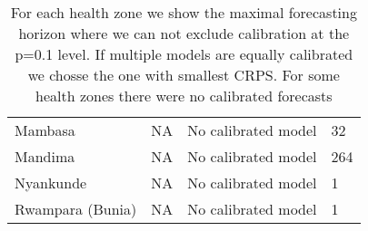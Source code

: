 \begin{table}[h!]
\begin{tabular}{|l|l|l|l|}
  Mambasa & NA & No calibrated model & 32 \\ 
  Mandima & NA & No calibrated model & 264 \\ 
  Nyankunde & NA & No calibrated model & 1 \\ 
  Rwampara (Bunia) & NA & No calibrated model & 1 \\ 
   \hline
\end{tabular}
\caption{For each health zone we show the maximal forecasting horizon where we can not exclude calibration at the p=0.1 level. If multiple models are equally calibrated we chosse the one with smallest CRPS. For some health zones there were no calibrated forecasts} 
\label{tab:best_model}
\end{table}
